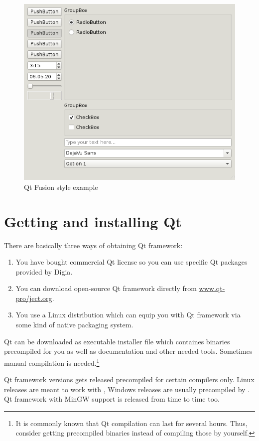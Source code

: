\begin{figure}[ht]
\centering\includegraphics{graphics/laboratory/01-fusion.png}
\caption{Qt Fusion style example}\label{figure:fusion}
\end{figure}

\section{Getting and installing Qt}
There are basically three ways of obtaining Qt framework:
\begin{enumerate}
\item You have bought commercial Qt license so you can use specific Qt packages provided by Digia.
\item You can download open-source Qt framework directly from \href{http://www.qt-project.org/}{www.qt-pro\-/ject.org}.
\item You use a Linux distribution which can equip you with Qt framework via some kind of native packaging system.
\end{enumerate}

Qt can be downloaded as executable installer file which containes binaries precompiled for you as well as documentation and other needed tools. Sometimes manual compilation is needed.\footnote{It is commonly known that Qt compilation can last for several hours. Thus, consider getting precompiled binaries instead of compiling those by yourself.}

Qt framework versions gets released precompiled for certain compilers only. Linux releases are meant to work with , Windows releases are usually precompiled by . Qt framework with MinGW support is released from time to time too.

